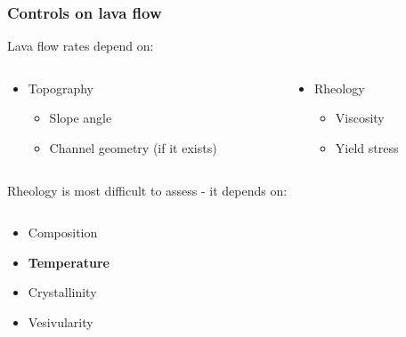 \documentclass{beamer}
\begin{document}
\begin{frame}
  \frametitle{Controls on lava flow}

  Lava flow rates depend on:

  \begin{columns}[t]

    \begin{column}{0.5\paperwidth}

      \begin{itemize}
      \item Topography \\
        \begin{itemize}
        \item Slope angle \\
        \item Channel geometry (if it exists) \\
        \end{itemize}
      \end{itemize}

    \end{column}

    \begin{column}{0.5\paperwidth}

    \begin{itemize}
    \item Rheology \\
      \begin{itemize}
      \item Viscosity \\
      \item Yield stress \\ 
      \end{itemize}
    \end{itemize}

  \end{column}

\end{columns}

  \vspace{0.5cm}
  
  Rheology is most difficult to assess - it depends on:

  \begin{columns}[t]

    \begin{column}{0.5\paperwidth}

      \begin{itemize}
      \item Composition \\
      \item \textbf{Temperature} \\
      \item Crystallinity \\
      \item Vesivularity \\
      \end{itemize}


\end{column}
\end{columns}
\end{frame}
\end{document}
